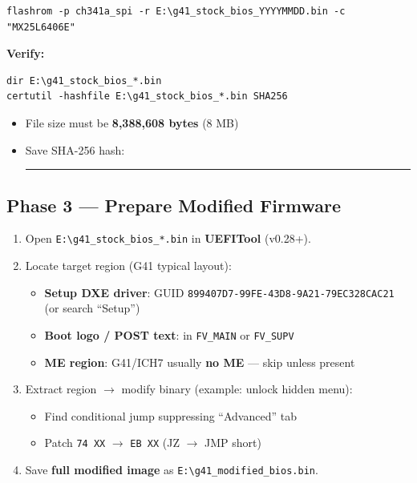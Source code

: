 \begin{lstlisting}[style=vbfcStyle, caption={Dump Stock BIOS}]
flashrom -p ch341a_spi -r E:\g41_stock_bios_YYYYMMDD.bin -c "MX25L6406E"
\end{lstlisting}

\textbf{Verify:}
\begin{lstlisting}[style=vbfcStyle]
dir E:\g41_stock_bios_*.bin
certutil -hashfile E:\g41_stock_bios_*.bin SHA256
\end{lstlisting}

\begin{itemize}
    \item File size must be \textbf{8,388,608 bytes} (8 MB)
    \item Save SHA-256 hash: \rule{6cm}{0.4pt}
\end{itemize}

\subsection*{Phase 3 — Prepare Modified Firmware}

\begin{enumerate}
    \item Open \texttt{E:\textbackslash g41\_stock\_bios\_*.bin} in \textbf{UEFITool} (v0.28+).
    \item Locate target region (G41 typical layout):
    \begin{itemize}
        \item \textbf{Setup DXE driver}: GUID \texttt{899407D7-99FE-43D8-9A21-79EC328CAC21} (or search ``Setup'')
        \item \textbf{Boot logo / POST text}: in \texttt{FV\_MAIN} or \texttt{FV\_SUPV}
        \item \textbf{ME region}: G41/ICH7 usually \textbf{no ME} — skip unless present
    \end{itemize}
    \item Extract region $\to$ modify binary (example: unlock hidden menu):
    \begin{itemize}
        \item Find conditional jump suppressing ``Advanced'' tab
        \item Patch \texttt{74 XX} $\to$ \texttt{EB XX} (JZ $\to$ JMP short)
    \end{itemize}
    \item Save \textbf{full modified image} as \texttt{E:\textbackslash g41\_modified\_bios.bin}.
\end{enumerate}

